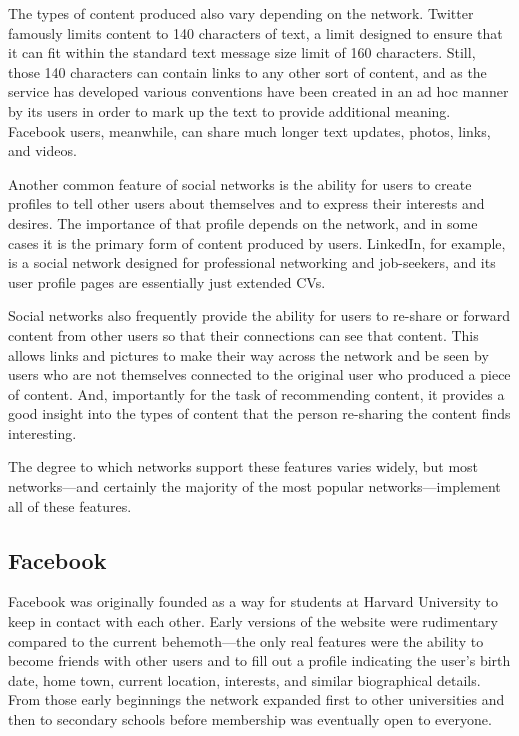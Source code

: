 The types of content produced also vary depending on the network. Twitter famously limits content to 140 characters of text, a limit designed to ensure that it can fit within the standard text message size limit of 160 characters. Still, those 140 characters can contain links to any other sort of content, and as the service has developed various conventions have been created in an ad hoc manner by its users in order to mark up the text to provide additional meaning. Facebook users, meanwhile, can share much longer text updates, photos, links, and videos. 

Another common feature of social networks is the ability for users to create profiles to tell other users about themselves and to express their interests and desires. The importance of that profile depends on the network, and in some cases it is the primary form of content produced by users. LinkedIn, for example, is a social network designed for professional networking and job-seekers, and its user profile pages are essentially just extended CVs.

Social networks also frequently provide the ability for users to re-share or forward content from other users so that their connections can see that content. This allows links and pictures to make their way across the network and be seen by users who are not themselves connected to the original user who produced a piece of content. And, importantly for the task of recommending content, it provides a good insight into the types of content that the person re-sharing the content finds interesting.

The degree to which networks support these features varies widely, but most networks---and certainly the majority of the most popular networks---implement all of these features.

\subsection{Facebook}

Facebook was originally founded as a way for students at Harvard University to keep in contact with each other. Early versions of the website were rudimentary compared to the current behemoth---the only real features were the ability to become friends with other users and to fill out a profile indicating the user's birth date, home town, current location, interests, and similar biographical details. From those early beginnings the network expanded first to other universities and then to secondary schools before membership was eventually open to everyone.

